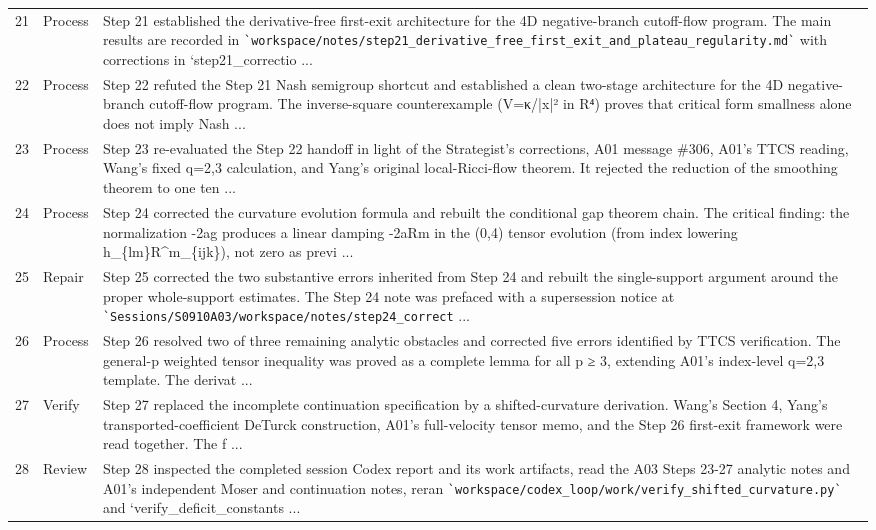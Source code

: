 \documentclass[UTF8,fontset=fandol,zihao=-4]{ctexart}
\begin{document}
\begin{longtable}{r p{} >{\raggedright\arraybackslash}p{}}
21 & Process & Step 21 established the derivative-free first-exit architecture for the 4D negative-branch cutoff-flow program. The main results are recorded in \nolinkurl{`workspace/notes/step21_derivative_free_first_exit_and_plateau_regularity.md`} with corrections in `step21\_correctio ...\\
22 & Process & Step 22 refuted the Step 21 Nash semigroup shortcut and established a clean two-stage architecture for the 4D negative-branch cutoff-flow program. The inverse-square counterexample (V=κ/|x|² in R⁴) proves that critical form smallness alone does not imply Nash  ...\\
23 & Process & Step 23 re-evaluated the Step 22 handoff in light of the Strategist's corrections, A01 message \#306, A01's TTCS reading, Wang's fixed q=2,3 calculation, and Yang's original local-Ricci-flow theorem. It rejected the reduction of the smoothing theorem to one ten ...\\
24 & Process & Step 24 corrected the curvature evolution formula and rebuilt the conditional gap theorem chain. The critical finding: the normalization -2ag produces a linear damping -2aRm in the (0,4) tensor evolution (from index lowering h\_\{lm\}R\textasciicircum{}m\_\{ijk\}), not zero as previ ...\\
25 & Repair & Step 25 corrected the two substantive errors inherited from Step 24 and rebuilt the single-support argument around the proper whole-support estimates. The Step 24 note was prefaced with a supersession notice at \nolinkurl{`Sessions/S0910A03/workspace/notes/step24_correct} ...\\
26 & Process & Step 26 resolved two of three remaining analytic obstacles and corrected five errors identified by TTCS verification. The general-p weighted tensor inequality was proved as a complete lemma for all p ≥ 3, extending A01's index-level q=2,3 template. The derivat ...\\
27 & Verify & Step 27 replaced the incomplete continuation specification by a shifted-curvature derivation. Wang’s Section 4, Yang’s transported-coefficient DeTurck construction, A01’s full-velocity tensor memo, and the Step 26 first-exit framework were read together. The f ...\\
28 & Review & Step 28 inspected the completed session Codex report and its work artifacts, read the A03 Steps 23-27 analytic notes and A01's independent Moser and continuation notes, reran \nolinkurl{`workspace/codex_loop/work/verify_shifted_curvature.py`} and `verify\_deficit\_constants ...\\

\end{longtable}
\end{document}
